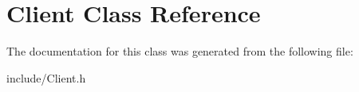 \hypertarget{classClient}{}\section{Client Class Reference}
\label{classClient}


The documentation for this class was generated from the following file\+:\begin{DoxyCompactItemize}
\item 
include/Client.\+h\end{DoxyCompactItemize}
